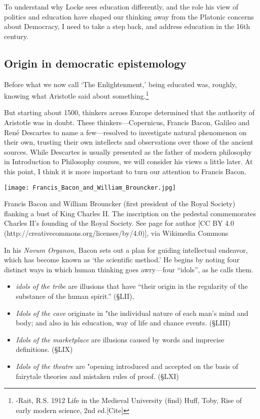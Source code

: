 To understand why Locke sees education differently, and the role his view of politics and education have shaped our thinking away from the Platonic concerns about Democracy, I need to take a step back, and address education in the 16th century. 

\subsection{Origin in democratic epistemology}
\label{originindemocraticepistemology}

Before what we now call `The Enlightenment,' being educated was, roughly, knowing what Aristotle said about something.\footnote{-Rait, R.S. 1912 Life in the Medieval University (find)
Huff, Toby, Rise of early modern science, 2nd ed.[Cite]} 

But starting about 1500, thinkers across Europe determined that the authority of Aristotle was in doubt. These thinkers---Copernicus, Francis Bacon, Galileo and René Descartes to name a few---resolved to investigate natural phenomenon on their own, trusting their own intellects and observations over those of the ancient sources. While Descartes is usually presented as the father of modern philosophy in Introduction to Philosophy courses, we will consider his views a little later. At this point, I think it is more important to turn our attention to Francis Bacon.\begin{marginfigure}\texttt{[image: Francis\_Bacon\_and\_William\_Brouncker.jpg]}\caption{Francis Bacon and William Brouncker (first president of the Royal Society) flanking a bust of King Charles II. The inscription on the pedestal commemorates Charles II's founding of the Royal Society. See page for author [CC BY 4.0 (http://creativecommons.org/licenses/by/4.0)], via Wikimedia Commons}\label{fig:royalsociety}\end{marginfigure}

In his \emph{Novum Organon,} Bacon sets out a plan for guiding intellectual endeavor, which has become known as `the scientific method.' He begins by noting four distinct ways in which human thinking goes awry---four ``idols'', as he calls them. 

\begin{itemize}
\item \emph{idols of the tribe} are illusions that have ``their origin in the regularity of the substance of the human spirit.'' (\S LII),

\item \emph{Idols of the cave} originate in "the individual nature of each man's mind and body; and also in his education, way of life and chance events. (\S LIII)

\item \emph{Idols of the marketplace} are illusions caused by words and imprecise definitions. (\S LIX)

\item \emph{Idols of the theatre} are "opening introduced and accepted on the basis of fairytale theories and mistaken rules of proof. (\S LXI)

\end{itemize}

